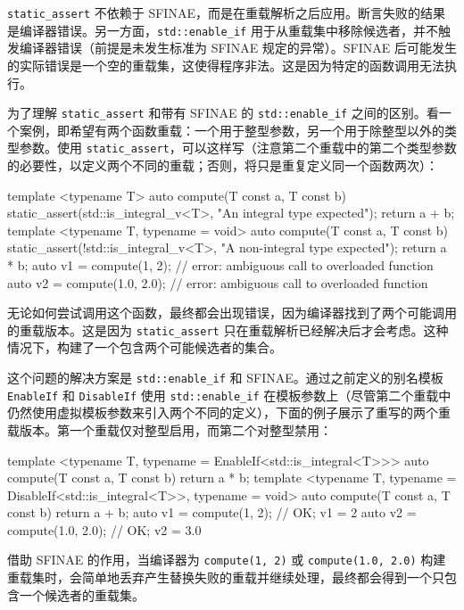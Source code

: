 \verb|static_assert| 不依赖于 SFINAE，而是在重载解析之后应用。断言失败的结果是编译器错误。另一方面，\verb|std::enable_if| 用于从重载集中移除候选者，并不触发编译器错误（前提是未发生标准为 SFINAE 规定的异常）。SFINAE 后可能发生的实际错误是一个空的重载集，这使得程序非法。这是因为特定的函数调用无法执行。

为了理解 \verb|static_assert| 和带有 SFINAE 的 \verb|std::enable_if| 之间的区别。看一个案例，即希望有两个函数重载：一个用于整型参数，另一个用于除整型以外的类型参数。使用 \verb|static_assert|，可以这样写（注意第二个重载中的第二个类型参数的必要性，以定义两个不同的重载；否则，将只是重复定义同一个函数两次）：

\begin{cpp}
template <typename T>
auto compute(T const a, T const b)
{
    static_assert(std::is_integral_v<T>, "An integral type expected");
    return a + b;
}
template <typename T, typename = void>
auto compute(T const a, T const b)
{
    static_assert(!std::is_integral_v<T>, "A non-integral type expected");
    return a * b;
}
auto v1 = compute(1, 2);
// error: ambiguous call to overloaded function
auto v2 = compute(1.0, 2.0);
// error: ambiguous call to overloaded function
\end{cpp}

无论如何尝试调用这个函数，最终都会出现错误，因为编译器找到了两个可能调用的重载版本。这是因为 \verb|static_assert| 只在重载解析已经解决后才会考虑。这种情况下，构建了一个包含两个可能候选者的集合。

这个问题的解决方案是 \verb|std::enable_if| 和 SFINAE。通过之前定义的别名模板 \verb|EnableIf| 和 \verb|DisableIf| 使用 \verb|std::enable_if| 在模板参数上（尽管第二个重载中仍然使用虚拟模板参数来引入两个不同的定义），下面的例子展示了重写的两个重载版本。第一个重载仅对整型启用，而第二个对整型禁用：

\begin{cpp}
template <typename T, typename = EnableIf<std::is_integral<T>>>
auto compute(T const a, T const b)
{
    return a * b;
}
template <typename T, typename = DisableIf<std::is_integral<T>>,
typename = void>
auto compute(T const a, T const b)
{
    return a + b;
}
auto v1 = compute(1, 2);     // OK; v1 = 2
auto v2 = compute(1.0, 2.0); // OK; v2 = 3.0
\end{cpp}

借助 SFINAE 的作用，当编译器为 \verb|compute(1, 2)| 或 \verb|compute(1.0, 2.0)| 构建重载集时，会简单地丢弃产生替换失败的重载并继续处理，最终都会得到一个只包含一个候选者的重载集。
